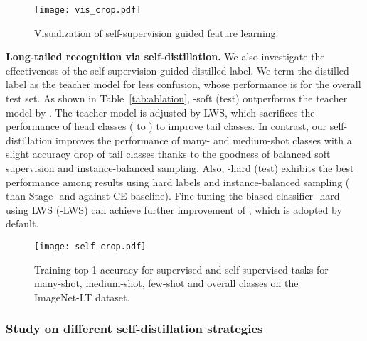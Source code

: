 \documentclass[10pt,twocolumn,letterpaper]{article}
\begin{document}
\begin{figure}[t]
\centering
\vspace{-2mm}
\texttt{[image: vis\_crop.pdf]}
    \caption{Visualization of self-supervision guided feature learning.}
    \label{fig:self_vis}
\vspace{-2mm}
\end{figure}

\medskip
\noindent\textbf{Long-tailed recognition via self-distillation.} We also investigate the effectiveness of the self-supervision guided distilled label. We term the distilled label as the teacher model for less confusion, whose performance is  for the overall test set. As shown in Table~\ref{tab:ablation}, \uppercase\expandafter{}-soft (test) outperforms the teacher model by . The teacher model is adjusted by LWS, which sacrifices the performance of head classes ( to ) to improve tail classes. In contrast, our self-distillation improves the performance of many- and medium-shot classes with a slight accuracy drop of tail classes thanks to the goodness of balanced soft supervision and instance-balanced sampling. Also, \uppercase\expandafter{}-hard (test) exhibits the best performance among results using hard labels and instance-balanced sampling ( than Stage-\uppercase\expandafter{} and  against CE baseline). Fine-tuning the biased classifier \uppercase\expandafter{}-hard using LWS (\uppercase\expandafter{}-LWS) can achieve further improvement of , which is adopted by default.

\begin{figure}[t]
\centering
\texttt{[image: self\_crop.pdf]}
  \caption{Training top-1 accuracy for supervised and self-supervised tasks for many-shot, medium-shot, few-shot and overall classes on the ImageNet-LT dataset.}
  \label{fig:self}
\end{figure}

\subsubsection{Study on different self-distillation strategies}
\end{document}

